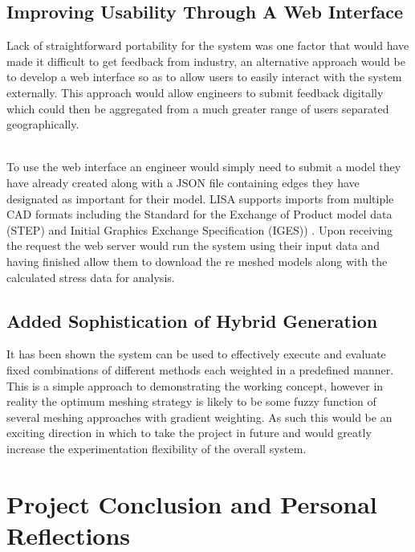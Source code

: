 \subsection{Improving Usability Through A Web Interface}

\noindent
Lack of straightforward portability for the system was one factor that would have made it difficult to get feedback from industry, an alternative approach would be to develop a web interface so as to allow users to easily interact with the system externally. This approach would allow engineers to submit feedback digitally which could then be aggregated from a much greater range of users separated geographically. \\\ 


\noindent
To use the web interface an engineer would simply need to submit a model they have already created  along with a JSON file containing edges they have designated as important for their model. LISA supports imports from multiple CAD formats including the Standard for the Exchange of Product model data (STEP) and Initial Graphics Exchange Specification (IGES)) \cite{LISAManual}. Upon receiving the request the web server would run the system using their input data and having finished allow them to download the re meshed models along with the calculated stress data for analysis.


\subsection{Added Sophistication of Hybrid Generation}
It has been shown the system can be used to effectively execute and evaluate fixed combinations of different methods each weighted in a predefined manner. This is a simple approach to demonstrating the working concept, however in reality the optimum meshing strategy is likely to be some fuzzy function of several meshing approaches with gradient weighting. As such this would be an exciting direction in which to take the project in future and would greatly increase the experimentation flexibility of the overall system.


\section{Project Conclusion and Personal Reflections}

